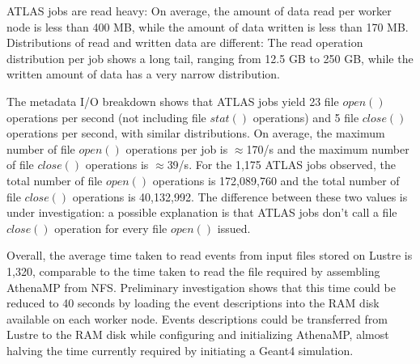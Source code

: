 ATLAS jobs are read heavy: On average, the amount of data read per worker
node is less than 400 MB, while the amount of data written is less than 170
MB\@. Distributions of read and written data are different: The read
operation distribution per job shows a long tail, ranging from 12.5 GB to 250
GB, while the written amount of data has a very narrow distribution.

The metadata I/O breakdown shows that ATLAS jobs yield 23 file \(open()\)
operations per second (not including file \(stat()\) operations) and 5 file
\(close()\) operations per second, with similar distributions. On average,
the maximum number of file \(open()\) operations per job is \(\approx\)170/s
and the maximum number of file \(close()\) operations is \(\approx\)39/s. For
the 1,175 ATLAS jobs observed, the total number of file \(open()\) operations
is 172,089,760 and the total number of file \(close()\) operations is
40,132,992. The difference between these two values is under
investigation: a possible explanation is that ATLAS jobs don't call a file
\(close()\) operation for every file \(open()\) issued.

Overall, the average time taken to read events from input files stored on
Lustre is 1,320, comparable to the time taken to read the file required by
assembling AthenaMP from NFS\@. Preliminary investigation shows that this
time could be reduced to 40 seconds by loading the event descriptions into
the RAM disk available on each worker node. Events descriptions could be
transferred from Lustre to the RAM disk while configuring and initializing
AthenaMP, almost halving the time currently required by initiating a Geant4
simulation.